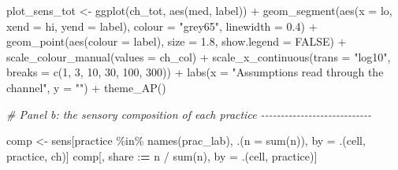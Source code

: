 \documentclass[
  11pt,
]{article}
\newenvironment{Shaded}{\begin{snugshade}}{\end{snugshade}}
\newcommand{\AttributeTok}[1]{\textcolor[rgb]{0.77,0.63,0.00}{#1}}
\newcommand{\CommentTok}[1]{\textcolor[rgb]{0.56,0.35,0.01}{\textit{#1}}}
\newcommand{\ConstantTok}[1]{\textcolor[rgb]{0.00,0.00,0.00}{#1}}
\newcommand{\DecValTok}[1]{\textcolor[rgb]{0.00,0.00,0.81}{#1}}
\newcommand{\ErrorTok}[1]{\textcolor[rgb]{0.64,0.00,0.00}{\textbf{#1}}}
\newcommand{\FloatTok}[1]{\textcolor[rgb]{0.00,0.00,0.81}{#1}}
\newcommand{\FunctionTok}[1]{\textcolor[rgb]{0.00,0.00,0.00}{#1}}
\newcommand{\NormalTok}[1]{#1}
\newcommand{\OtherTok}[1]{\textcolor[rgb]{0.56,0.35,0.01}{#1}}
\newcommand{\SpecialCharTok}[1]{\textcolor[rgb]{0.00,0.00,0.00}{#1}}
\newcommand{\StringTok}[1]{\textcolor[rgb]{0.31,0.60,0.02}{#1}}
\begin{document}
\begin{Shaded}
\begin{Highlighting}[]
\NormalTok{plot\_sens\_tot }\OtherTok{\textless{}{-}} \FunctionTok{ggplot}\NormalTok{(ch\_tot, }\FunctionTok{aes}\NormalTok{(med, label)) }\SpecialCharTok{+}
  \FunctionTok{geom\_segment}\NormalTok{(}\FunctionTok{aes}\NormalTok{(}\AttributeTok{x =}\NormalTok{ lo, }\AttributeTok{xend =}\NormalTok{ hi, }\AttributeTok{yend =}\NormalTok{ label), }\AttributeTok{colour =} \StringTok{"grey65"}\NormalTok{,}
               \AttributeTok{linewidth =} \FloatTok{0.4}\NormalTok{) }\SpecialCharTok{+}
  \FunctionTok{geom\_point}\NormalTok{(}\FunctionTok{aes}\NormalTok{(}\AttributeTok{colour =}\NormalTok{ label), }\AttributeTok{size =} \FloatTok{1.8}\NormalTok{, }\AttributeTok{show.legend =} \ConstantTok{FALSE}\NormalTok{) }\SpecialCharTok{+}
  \FunctionTok{scale\_colour\_manual}\NormalTok{(}\AttributeTok{values =}\NormalTok{ ch\_col) }\SpecialCharTok{+}
  \FunctionTok{scale\_x\_continuous}\NormalTok{(}\AttributeTok{trans =} \StringTok{"log10"}\NormalTok{, }\AttributeTok{breaks =} \FunctionTok{c}\NormalTok{(}\DecValTok{1}\NormalTok{, }\DecValTok{3}\NormalTok{, }\DecValTok{10}\NormalTok{, }\DecValTok{30}\NormalTok{, }\DecValTok{100}\NormalTok{, }\DecValTok{300}\NormalTok{)) }\SpecialCharTok{+}
  \FunctionTok{labs}\NormalTok{(}\AttributeTok{x =} \StringTok{"Assumptions read through the channel"}\NormalTok{, }\AttributeTok{y =} \StringTok{""}\NormalTok{) }\SpecialCharTok{+}
  \FunctionTok{theme\_AP}\NormalTok{()}

\CommentTok{\# Panel b: the sensory composition of each practice {-}{-}{-}{-}{-}{-}{-}{-}{-}{-}{-}{-}{-}{-}{-}{-}{-}{-}{-}{-}{-}{-}{-}{-}{-}{-}{-}{-}}

\NormalTok{comp }\OtherTok{\textless{}{-}}\NormalTok{ sens[practice }\SpecialCharTok{\%in\%} \FunctionTok{names}\NormalTok{(prac\_lab), .(}\AttributeTok{n =} \FunctionTok{sum}\NormalTok{(n)),}
\NormalTok{             by }\OtherTok{=}\NormalTok{ .(cell, practice, ch)]}
\NormalTok{comp[, share }\SpecialCharTok{:}\ErrorTok{=}\NormalTok{ n }\SpecialCharTok{/} \FunctionTok{sum}\NormalTok{(n), by }\OtherTok{=}\NormalTok{ .(cell, practice)]}


\end{Highlighting}
\end{Shaded}
\end{document}
